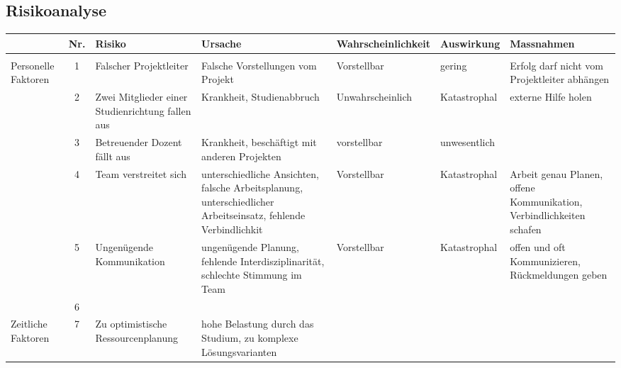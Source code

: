 \begin{landscape}
\subsection{Risikoanalyse}
\begin{table}[h!]
    \small
    \centering
    \begin{tabular}{p{} c p{} p{} p{} p{} p{}}
		& Nr. & Risiko & Ursache & Wahrscheinlichkeit & Auswirkung & Massnahmen \\
        \hline \hline
        & & & & & & \\
        \rowcolor{yellow} Personelle Faktoren 
            & 1 
            & Falscher Projektleiter 
            & Falsche Vorstellungen vom Projekt 
            & Vorstellbar 
            & gering 
            & Erfolg darf nicht vom Projektleiter abhängen \\ 
        \rowcolor{yellow}
	        & 2 
            & Zwei Mitglieder einer Studienrichtung fallen aus 
            & Krankheit, Studienabbruch 
            & Unwahrscheinlich 
            & Katastrophal 
            & externe Hilfe holen \\
        \rowcolor{green}
            & 3 
            & Betreuender Dozent fällt aus 
            & Krankheit, beschäftigt mit anderen Projekten 
            & vorstellbar 
            & unwesentlich 
            & \\
        \rowcolor{yellow}
            & 4	
            & Team verstreitet sich	
            & unterschiedliche Ansichten, falsche Arbeitsplanung, unterschiedlicher Arbeitseinsatz, fehlende Verbindlichkit	
            & Vorstellbar 
            & Katastrophal 
            & Arbeit genau Planen, offene Kommunikation, Verbindlichkeiten schafen \\
        \rowcolor{yellow}
            & 5	
            & Ungenügende Kommunikation 
            & ungenügende Planung, fehlende Interdisziplinarität, schlechte Stimmung im Team 
            & Vorstellbar 
            & Katastrophal 
            & offen und oft Kommunizieren, Rückmeldungen geben \\
        \rowcolor{yellow}
            & 6	
            & 
            & 
            & 
            & 
            & \\
        \rowcolor{yellow} Zeitliche Faktoren 
            & 7 
            & Zu optimistische Ressourcenplanung 
            & hohe Belastung durch das Studium, zu komplexe Lösungsvarianten 

\end{tabular}
\end{table}
\end{landscape}

